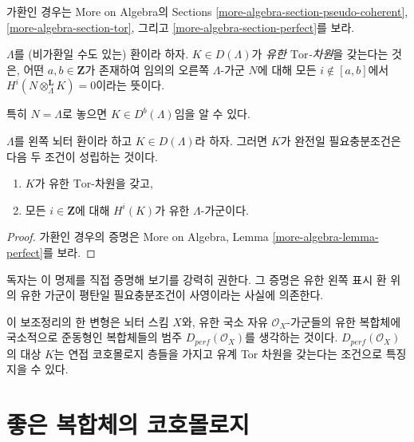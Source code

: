 \noindent
가환인 경우는 More on Algebra의 Sections
\ref{more-algebra-section-pseudo-coherent},
\ref{more-algebra-section-tor}, 그리고
\ref{more-algebra-section-perfect}를 보라.

\begin{definition}
\label{definition-finite-tor-dimension}
$\Lambda$를 (비가환일 수도 있는) 환이라 하자.
$K\in D(\Lambda)$가 {\it 유한 $\text{Tor}$-차원}을 갖는다는 것은,
어떤 $a, b \in \mathbf{Z}$가 존재하여 임의의 오른쪽
$\Lambda$-가군 $N$에 대해 모든 $i \not \in [a, b]$에서
$H^i(N \otimes_{\Lambda}^\mathbf{L} K) = 0$이라는 뜻이다.
\end{definition}

\noindent
특히 $N = \Lambda$로 놓으면 $K \in D^b(\Lambda)$임을 알 수 있다.

\begin{lemma}
\label{lemma-characterize-perfect}
$\Lambda$를 왼쪽 뇌터 환이라 하고 $K\in D(\Lambda)$라 하자.
그러면 $K$가 완전일 필요충분조건은 다음 두 조건이 성립하는 것이다.
\begin{enumerate}
\item
$K$가 유한 $\text{Tor}$-차원을 갖고,
\item
모든 $i \in \mathbf{Z}$에 대해 $H^i(K)$가 유한 $\Lambda$-가군이다.
\end{enumerate}
\end{lemma}

\begin{proof}
가환인 경우의 증명은 More on Algebra, Lemma
\ref{more-algebra-lemma-perfect}를 보라.
\end{proof}

\noindent
독자는 이 명제를 직접 증명해 보기를 강력히 권한다. 그 증명은
유한 왼쪽 표시 환 위의 유한 가군이 평탄일 필요충분조건이
사영이라는 사실에 의존한다.

\begin{remark}
\label{remark-variant}
이 보조정리의 한 변형은 뇌터 스킴 $X$와, 유한 국소 자유
$\mathcal{O}_X$-가군들의 유한 복합체에 국소적으로 준동형인
복합체들의 범주 $D_{perf}(\mathcal{O}_X)$를 생각하는 것이다.
$D_{perf}(\mathcal{O}_X)$의 대상 $K$는 연접 코호몰로지 층들을
가지고 유계 Tor 차원을 갖는다는 조건으로 특징지을 수 있다.
\end{remark}







\section{좋은 복합체의 코호몰로지}
\label{section-cohomology-ctf}

